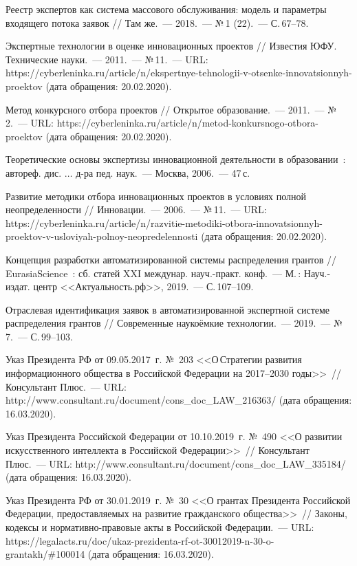 \begin{thebibliography}{99}
\bibitem{} Реестр экспертов как система массового обслуживания: модель и параметры входящего потока заявок // Там же.~--- 2018.~--- №\,1 (22).~--- С.\,67--78.

\bibitem{} Экспертные технологии в оценке инновационных проектов // Известия ЮФУ. Технические науки.~--- 2011.~--- №\,11.~--- URL: https://cyberleninka.ru/article/n/ekspertnye-tehnologii-v-otsenke-innovatsionnyh-proektov (дата обращения: 20.02.2020).

\bibitem{} Метод конкурсного отбора проектов // Открытое образование.~--- 2011.~--- №\,2.~--- URL: https://cyberleninka.ru/article/n/metod-konkursnogo-otbora-proektov (дата обращения: 20.02.2020).

\bibitem{} Теоретические основы экспертизы инновационной деятельности в образовании~: автореф. дис. $\dots$ д-ра пед. наук.~--- Москва, 2006.~--- 47\,с.


\bibitem{} Развитие методики отбора инновационных проектов в условиях полной неопределенности // Инновации.~--- 2006.~--- №\,11.~--- URL: https://cyberleninka.ru/article/n/razvitie-metodiki-otbora-innovatsionnyh-proektov-v-usloviyah-polnoy-neopredelennosti (дата обращения: 20.02.2020).

\bibitem{} Концепция разработки автоматизированной системы распределения грантов // EurasiaScience~: сб. статей XXI междунар. науч.-практ. конф.~--- М.\,: Науч.-издат. центр <<Актуальность.рф>>, 2019.~--- С.\,107--109.

\bibitem{} Отраслевая идентификация заявок в автоматизированной экспертной системе распределения грантов // Современные наукоёмкие технологии.~--- 2019.~--- №\,7.~--- С.\,99--103.

\bibitem{}Указ Президента РФ от 09.05.2017~г. №~203 <<О\,Стратегии развития информационного общества в Российской Федерации на 2017--2030 годы>>~// Консультант Плюс.~--- URL: http://www.consultant.ru/document/cons\_doc\_LAW\_216363/ (дата обращения: 16.03.2020).

\bibitem{}Указ Президента Российской Федерации от 10.10.2019~г. №~490 <<О развитии искусственного интеллекта в Российской Федерации>>~// Консультант Плюс.~--- URL: http://www.consultant.ru/document/cons\_doc\_LAW\_335184/ (дата обращения: 16.03.2020).

\bibitem{}Указ Президента РФ от 30.01.2019~г. №~30 <<О грантах Президента Российской Федерации, предоставляемых на развитие гражданского общества>>~// Законы, кодексы и нормативно-правовые акты в Российской Федерации.~--- URL: https://legalacts.ru/doc/ukaz-prezidenta-rf-ot-30012019-n-30-o-grantakh/\#100014 (дата обращения: 16.03.2020).



\end{thebibliography}
